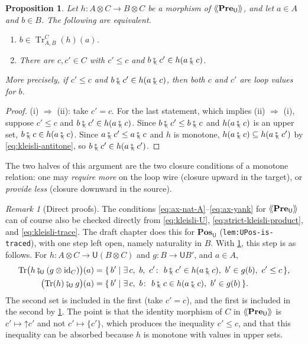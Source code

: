 \documentclass[11pt,a4paper]{article}
\theoremstyle{plain}
\newtheorem{proposition}[theorem]{Proposition}
\theoremstyle{definition}
\theoremstyle{remark}
\newtheorem{remark}[theorem]{Remark}
\newcommand{\Cat}[1]{\mathbf{#1}}
\newcommand{\Pre}{\Cat{Pre}}
\newcommand{\U}{\mathsf{U}}
\newcommand{\PreU}{\Pre_{\U}}
\providecommand{\llangle}{\mathopen{\langle\mkern-3.5mu\langle}}
\providecommand{\rrangle}{\mathclose{\rangle\mkern-3.5mu\rangle}}
\newcommand{\tL}[1]{\llangle #1 \rrangle}
\newcommand{\thenU}{\mathbin{\fatsemi_{\U}}}
\newcommand{\tc}{\mathbin{\fatsemi_{\!\scriptscriptstyle\langle}}}
\newcommand{\up}{\mathord{\uparrow}}
\DeclareMathOperator{\Tr}{Tr}
\newcommand{\id}{\mathrm{id}}
\newcommand{\lbl}[1]{\nolinkurl{#1}}
\begin{document}
\begin{proposition}
    \label{prop:trace-leq}
    Let $h \colon A \otimes C \to B \otimes C$ be a morphism of $\tL{\PreU}$, and let $a \in A$ and $b \in B$.
    The following are equivalent.
    \begin{enumerate}[label=(\roman*)]
        \item $b \in \Tr^{C}_{A,B}(h)(a)$.
        \item There are $c, c' \in C$ with $c' \leq c$ and $b \tc c' \in h(a \tc c)$.
    \end{enumerate}
    More precisely, if $c' \leq c$ and $b \tc c' \in h(a \tc c)$, then both $c$ and $c'$ are loop values for $b$.
\end{proposition}
\begin{proof}
    (i) $\Rightarrow$ (ii): take $c' = c$.
    For the last statement, which implies (ii) $\Rightarrow$ (i), suppose $c' \leq c$ and $b \tc c' \in h(a \tc c)$.
    Since $b \tc c' \leq b \tc c$ and $h(a \tc c)$ is an upper set, $b \tc c \in h(a \tc c)$.
    Since $a \tc c' \leq a \tc c$ and $h$ is monotone, $h(a \tc c) \subseteq h(a \tc c')$ by \cref{eq:kleisli-antitone}, so $b \tc c' \in h(a \tc c')$.
\end{proof}

The two halves of this argument are the two closure conditions of a monotone relation: one may \emph{require more} on the loop wire (closure upward in the target), or \emph{provide less} (closure downward in the source).

\begin{remark}[Direct proofs]
    \label{rem:direct-proofs}
    The conditions \cref{eq:ax-nat-A}--\cref{eq:ax-yank} for $\tL{\PreU}$ can of course also be checked directly from \cref{eq:kleisli-U}, \cref{eq:strict-kleisli-product}, and \cref{eq:kleisli-trace}.
    The draft chapter does this for $\Cat{Pos}_{\U}$ (\lbl{lem:UPos-is-traced}), with one step left open, namely naturality in $B$.
    With \cref{prop:trace-leq}, this step is as follows.
    For $h \colon A \otimes C \to \U(B \otimes C)$ and $g \colon B \to \U B'$, and $a \in A$,
    \begin{align*}
        \Tr\bigl(h \thenU (g \otimes \id_C)\bigr)(a)
        & = \{\, b' \mid \exists\, c,\ b,\ c' \colon\ b \tc c' \in h(a \tc c),\ b' \in g(b),\ c' \leq c \,\}, \\
        \bigl(\Tr(h) \thenU g\bigr)(a)
        & = \{\, b' \mid \exists\, c,\ b \colon\ b \tc c \in h(a \tc c),\ b' \in g(b) \,\}.
    \end{align*}
    The second set is included in the first (take $c' = c$), and the first is included in the second by \cref{prop:trace-leq}.
    The point is that the identity morphism of $C$ in $\tL{\PreU}$ is $c' \mapsto \up c'$ and not $c' \mapsto \{c'\}$, which produces the inequality $c' \leq c$, and that this inequality can be absorbed because $h$ is monotone with values in upper sets.
\end{remark}
\end{document}
